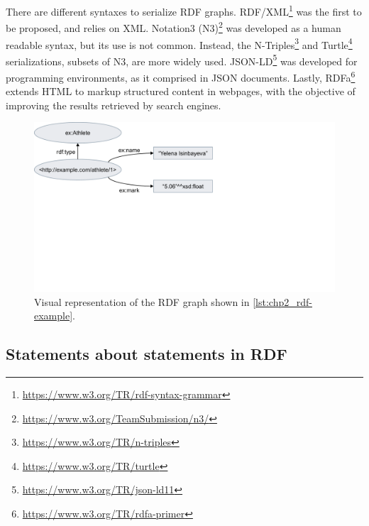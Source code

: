 There are different syntaxes to serialize RDF graphs. RDF/XML\footnote{\url{https://www.w3.org/TR/rdf-syntax-grammar}} was the first to be proposed, and relies on XML. Notation3 (N3)\footnote{\url{https://www.w3.org/TeamSubmission/n3/}} was developed as a human readable syntax, but its use is not common. Instead, the N-Triples\footnote{\url{https://www.w3.org/TR/n-triples}} and Turtle\footnote{\url{https://www.w3.org/TR/turtle}} serializations, subsets of N3, are more widely used. JSON-LD\footnote{\url{https://www.w3.org/TR/json-ld11}} was developed for programming environments, as it comprised in JSON documents. Lastly, RDFa\footnote{\url{https://www.w3.org/TR/rdfa-primer}} extends HTML to markup structured content in webpages, with the objective of improving the results retrieved by search engines. 



\begin{figure}[t]
\centering
\includegraphics[width=0.6\linewidth]{figures/chp2_rdf-example.pdf}
\caption[RDG graph example]{Visual representation of the RDF graph shown in \cref{lst:chp2_rdf-example}.}
\label{fig:chp2_rdf-example}
\end{figure}

\subsection{Statements about statements in RDF}

